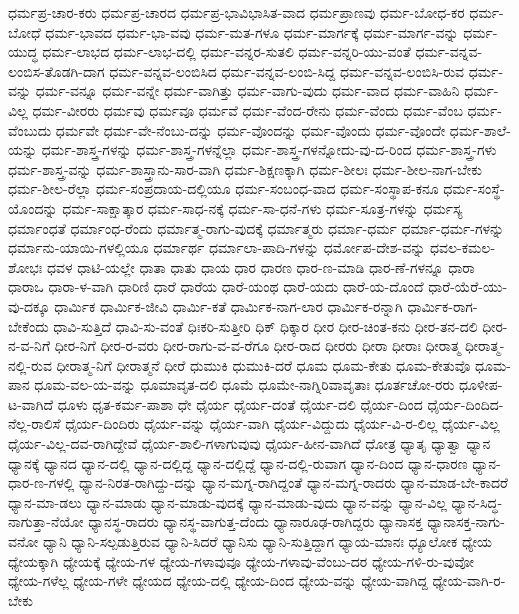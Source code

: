{ಧರ್ಮಪ್ರ-ಚಾರ-ಕರು
ಧರ್ಮಪ್ರ-ಚಾರದ
ಧರ್ಮಪ್ರ-ಭಾವಿಭಾಸಿತ-ವಾದ
ಧರ್ಮಪ್ರಾಣವು
ಧರ್ಮ-ಬೋಧ-ಕರ
ಧರ್ಮ-ಬೋಧೆ
ಧರ್ಮ-ಭಾವದ
ಧರ್ಮ-ಭಾ-ವವು
ಧರ್ಮ-ಮತ-ಗಳೂ
ಧರ್ಮ-ಮಾರ್ಗಕ್ಕೆ
ಧರ್ಮ-ಮಾರ್ಗ-ವನ್ನು
ಧರ್ಮ-ಯುದ್ಧ
ಧರ್ಮ-ಲಾಭದ
ಧರ್ಮ-ಲಾಭ-ದಲ್ಲಿ
ಧರ್ಮ-ವನ್ನರ-ಸುತಲಿ
ಧರ್ಮ-ವನ್ನರಿ-ಯು-ವಂತೆ
ಧರ್ಮ-ವನ್ನವ-ಲಂಬಿಸ-ತೊಡಗಿ-ದಾಗ
ಧರ್ಮ-ವನ್ನವ-ಲಂಬಿಸಿದ
ಧರ್ಮ-ವನ್ನವ-ಲಂಬಿ-ಸಿದ್ದ
ಧರ್ಮ-ವನ್ನವ-ಲಂಬಿಸಿ-ರುವ
ಧರ್ಮ-ವನ್ನು
ಧರ್ಮ-ವನ್ನೂ
ಧರ್ಮ-ವನ್ನೇ
ಧರ್ಮ-ವಾಗಿತ್ತು
ಧರ್ಮ-ವಾಗು-ವುದು
ಧರ್ಮ-ವಾದ
ಧರ್ಮ-ವಾಹಿನಿ
ಧರ್ಮ-ವಿಲ್ಲ
ಧರ್ಮ-ವೀರರು
ಧರ್ಮವು
ಧರ್ಮವೂ
ಧರ್ಮವೆ
ಧರ್ಮ-ವೆಂದ-ರೇನು
ಧರ್ಮ-ವೆಂದು
ಧರ್ಮ-ವೆಂಬ
ಧರ್ಮ-ವೆಂಬುದು
ಧರ್ಮವೇ
ಧರ್ಮ-ವೇ-ನೆಂಬು-ದನ್ನು
ಧರ್ಮ-ವೊಂದನ್ನು
ಧರ್ಮ-ವೊಂದು
ಧರ್ಮ-ವೊಂದೇ
ಧರ್ಮ-ಶಾಲೆ-ಯನ್ನು
ಧರ್ಮ-ಶಾಸ್ತ್ರ-ಗಳನ್ನು
ಧರ್ಮ-ಶಾಸ್ತ್ರ-ಗಳನ್ನೆಲ್ಲಾ
ಧರ್ಮ-ಶಾಸ್ತ್ರ-ಗಳನ್ನೋದು-ವು-ದ-ರಿಂದ
ಧರ್ಮ-ಶಾಸ್ತ್ರ-ಗಳು
ಧರ್ಮ-ಶಾಸ್ತ್ರ-ವನ್ನು
ಧರ್ಮ-ಶಾಸ್ತ್ರಾನು-ಸಾರ-ವಾಗಿ
ಧರ್ಮ-ಶಿಕ್ಷಣಕ್ಕಾಗಿ
ಧರ್ಮ-ಶೀಲಃ
ಧರ್ಮ-ಶೀಲ-ನಾಗ-ಬೇಕು
ಧರ್ಮ-ಶೀಲ-ರೆಲ್ಲಾ
ಧರ್ಮ-ಸಂಪ್ರದಾಯ-ದಲ್ಲಿಯೂ
ಧರ್ಮ-ಸಂಬಂಧ-ವಾದ
ಧರ್ಮ-ಸಂಸ್ಥಾಪ-ಕನೂ
ಧರ್ಮ-ಸಂಸ್ಥೆ-ಯೊಂದನ್ನು
ಧರ್ಮ-ಸಾಕ್ಷಾತ್ಕಾರ
ಧರ್ಮ-ಸಾಧ-ನಕ್ಕೆ
ಧರ್ಮ-ಸಾ-ಧನೆ-ಗಳು
ಧರ್ಮ-ಸೂತ್ರ-ಗಳನ್ನು
ಧರ್ಮಸ್ಯ
ಧರ್ಮಾಂಧತೆ
ಧರ್ಮಾಂಧ-ರೆಂದು
ಧರ್ಮಾತ್ಮ-ರಾಗು-ವುದಕ್ಕೆ
ಧರ್ಮಾತ್ಮರು
ಧರ್ಮಾ-ಧರ್ಮ
ಧರ್ಮಾ-ಧರ್ಮ-ಗಳನ್ನು
ಧರ್ಮಾನು-ಯಾಯಿ-ಗಳಲ್ಲಿಯೂ
ಧರ್ಮಾರ್ಥ
ಧರ್ಮಾಲಾ-ಪಾದಿ-ಗಳನ್ನು
ಧರ್ಮೋಪ-ದೇಶ-ವನ್ನು
ಧವಲ-ಕಮಲ-ಶೋಭಃ
ಧವಳ
ಧಾಟಿ-ಯಲ್ಲೇ
ಧಾತಾ
ಧಾತು
ಧಾಯ
ಧಾರ
ಧಾರಣ
ಧಾರ-ಣ-ಮಾಡಿ
ಧಾರ-ಣೆ-ಗಳನ್ನೂ
ಧಾರಾ
ಧಾರಾಒ
ಧಾರಾ-ಳ-ವಾಗಿ
ಧಾರಿಣಿ
ಧಾರೆ
ಧಾರೆಯ
ಧಾರೆ-ಯಂಥ
ಧಾರೆ-ಯದು
ಧಾರೆ-ಯ-ದೊಂದೆ
ಧಾರೆ-ಯೆರೆ-ಯು-ವು-ದಕ್ಕೂ
ಧಾರ್ಮಿಕ
ಧಾರ್ಮಿಕ-ಜೀವಿ
ಧಾರ್ಮಿ-ಕತೆ
ಧಾರ್ಮಿಕ-ನಾಗ-ಲಾರ
ಧಾರ್ಮಿಕ-ರನ್ನಾಗಿ
ಧಾರ್ಮಿಕ-ರಾಗ-ಬೇಕೆಂದು
ಧಾವಿ-ಸುತ್ತಿದೆ
ಧಾವಿ-ಸು-ವಂತೆ
ಧಿಃಕರಿ-ಸುತ್ತೀರಿ
ಧಿಕ್
ಧಿಕ್ಕಾರ
ಧೀರ
ಧೀರ-ಚಿಂತ-ಕನು
ಧೀರ-ತನ-ದಲಿ
ಧೀರ-ನ-ವ-ನಿಗೆ
ಧೀರ-ನಿಗೆ
ಧೀರ-ರ-ವರು
ಧೀರ-ರಾಗು-ವ-ವ-ರೆಗೂ
ಧೀರ-ರಾದ
ಧೀರರು
ಧೀರಾ
ಧೀರಾಃ
ಧೀರಾತ್ಮ
ಧೀರಾತ್ಮ-ನಲ್ಲಿ-ರುವ
ಧೀರಾತ್ಮ-ನಿಗೆ
ಧೀರಾತ್ಮನೆ
ಧೀರೆ
ಧುಮುಕಿ
ಧುಮುಕಿ-ದರೆ
ಧೂಮ
ಧೂಮ-ಕೇತು
ಧೂಮ-ಕೇತುವೊ
ಧೂಮ-ಪಾನ
ಧೂಮ-ವಲ-ಯ-ವನ್ನು
ಧೂಮಾವೃತ-ದಲಿ
ಧೂಮೆ
ಧೂಮೇ-ನಾಗ್ನಿರಿವಾವೃತಾಃ
ಧೂರ್ತಚೋ-ರರು
ಧೂಳೀಪ-ಟ-ವಾಗಿದೆ
ಧೂಳು
ಧೃತ-ಕರ್ಮ-ಪಾಶಾ
ಧೇ
ಧೈರ್ಯ
ಧೈರ್ಯ-ದಂತೆ
ಧೈರ್ಯ-ದಲಿ
ಧೈರ್ಯ-ದಿಂದ
ಧೈರ್ಯ-ದಿಂದಿದ-ನೆಲ್ಲ-ರಾಲಿಸೆ
ಧೈರ್ಯ-ದಿಂದಿರು
ಧೈರ್ಯ-ವನ್ನು
ಧೈರ್ಯ-ವಾಗಿ
ಧೈರ್ಯ-ವಿದ್ದುದು
ಧೈರ್ಯ-ವಿ-ರ-ಲಿಲ್ಲ
ಧೈರ್ಯ-ವಿಲ್ಲ
ಧೈರ್ಯ-ವಿಲ್ಲ-ದವ-ರಾಗಿದ್ದೇವೆ
ಧೈರ್ಯ-ಶಾಲಿ-ಗಳಾಗುವುವು
ಧೈರ್ಯ-ಹೀನ-ವಾಗಿದೆ
ಧೋತ್ರ
ಧ್ಯಾತೃ
ಧ್ಯಾತ್ವಾ
ಧ್ಯಾನ
ಧ್ಯಾನಕ್ಕೆ
ಧ್ಯಾನದ
ಧ್ಯಾನ-ದಲ್ಲಿ
ಧ್ಯಾನ-ದಲ್ಲಿದ್ದ
ಧ್ಯಾನ-ದಲ್ಲಿದ್ದೆ
ಧ್ಯಾನ-ದಲ್ಲಿ-ರುವಾಗ
ಧ್ಯಾನ-ದಿಂದ
ಧ್ಯಾನ-ಧಾರಣ
ಧ್ಯಾನ-ಧಾರ-ಣ-ಗಳಲ್ಲಿ
ಧ್ಯಾನ-ನಿರತ-ರಾಗಿದ್ದು-ದನ್ನು
ಧ್ಯಾನ-ಮಗ್ನ-ರಾಗಿದ್ದಂತೆ
ಧ್ಯಾನ-ಮಗ್ನ-ರಾದರು
ಧ್ಯಾನ-ಮಾಡ-ಬೇ-ಕಾದರೆ
ಧ್ಯಾನ-ಮಾ-ಡಲು
ಧ್ಯಾನ-ಮಾಡು
ಧ್ಯಾನ-ಮಾಡು-ವುದಕ್ಕೆ
ಧ್ಯಾನ-ಮಾಡು-ವುದು
ಧ್ಯಾನ-ವನ್ನು
ಧ್ಯಾನ-ವಿಲ್ಲ
ಧ್ಯಾನ-ಸಿದ್ಧ-ನಾಗುತ್ತಾ-ನೆಯೋ
ಧ್ಯಾನಸ್ಥ-ರಾದರು
ಧ್ಯಾನಸ್ಥ-ವಾಗುತ್ತ-ದೆಂದು
ಧ್ಯಾನಾರೂಢ-ರಾಗಿದ್ದರು
ಧ್ಯಾನಾಸಕ್ತ
ಧ್ಯಾನಾಸಕ್ತ-ನಾಗು-ವನೋ
ಧ್ಯಾನಿ
ಧ್ಯಾನಿ-ಸಲ್ಪಡುತ್ತಿರುವ
ಧ್ಯಾನಿ-ಸಿದರೆ
ಧ್ಯಾನಿಸು
ಧ್ಯಾನಿ-ಸುತ್ತಿದ್ದಾಗ
ಧ್ಯಾಯ-ಮಾನಃ
ಧ್ಯೂಲೋಕ
ಧ್ಯೇಯ
ಧ್ಯೇಯಕ್ಕಾಗಿ
ಧ್ಯೇಯಕ್ಕೆ
ಧ್ಯೇಯ-ಗಳ
ಧ್ಯೇಯ-ಗಳಾವುವೂ
ಧ್ಯೇಯ-ಗಳಾವು-ವೆಂಬು-ದರ
ಧ್ಯೇಯ-ಗಳಿ-ರು-ವುವೋ
ಧ್ಯೇಯ-ಗಳೆಲ್ಲ
ಧ್ಯೇಯ-ಗಳೇ
ಧ್ಯೇಯದ
ಧ್ಯೇಯ-ದಲ್ಲಿ
ಧ್ಯೇಯ-ದಿಂದ
ಧ್ಯೇಯ-ವನ್ನು
ಧ್ಯೇಯ-ವಾಗಿದ್ದ
ಧ್ಯೇಯ-ವಾಗಿ-ರ-ಬೇಕು
}
